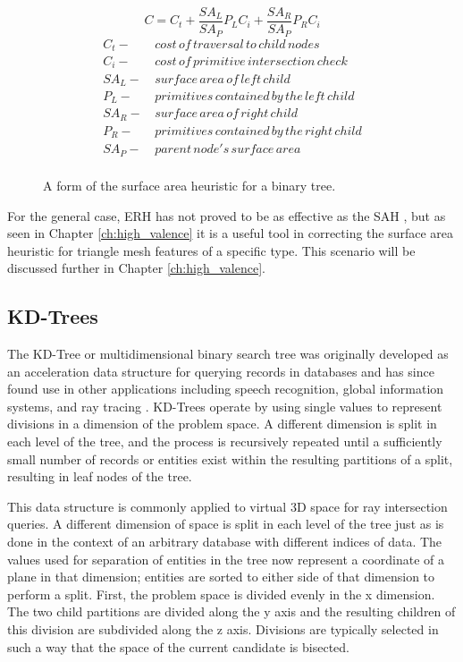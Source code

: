 \begin{figure}[H]
  \begin{equation}
    C =  C_{t} + \frac{SA_{L}}{SA_{P}}P_{L}C_{i} +  \frac{SA_{R}}{SA_{P}}P_{R}C_{i}
    \label{eq:SAH}
  \end{equation}
  \begin{align*}
    C_{t} - & \,cost\, of\, traversal\, to\, child\, nodes \\
    C_{i} - & \, cost\, of\, primitive\, intersection\, check\, \\
    SA_{L} - &  \,surface\, area\, of\, left\, child \\
    P_{L} - & \, primitives\, contained\, by\, the\, left\, child  \\
    SA_{R} - & \, surface\, area\, of\, right\, child \\
    P_{R} - & \, primitives\, contained\, by\, the\, right\, child \\
    SA_{P} - & \, parent\, node's \, surface \, area \\
  \end{align*}
  \caption[Formulation of the surface area heuristic.]{A form of the surface area heuristic for a binary tree.}
  \label{fig:SAH}
\end{figure}

For the general case, ERH has not proved to be as effective as the SAH \cite{Bittner_2013}, but as
seen in Chapter \ref{ch:high_valence} it is a useful tool in correcting the
surface area heuristic for triangle mesh features of a specific type. This
scenario will be discussed further in Chapter \ref{ch:high_valence}.

\subsection{KD-Trees}
\label{subsec:kd-trees}
The KD-Tree or multidimensional binary search tree was originally developed as
an acceleration data structure for querying records in databases and has since
found use in other applications including speech recognition, global information
systems, and ray tracing \cite{Bentley_1975}. KD-Trees operate by using single
values to represent divisions in a dimension of the problem space. A different
dimension is split in each level of the tree, and the process is recursively
repeated until a sufficiently small number of records or entities exist within
the resulting partitions of a split, resulting in leaf nodes of the tree.

This data structure is commonly applied to virtual 3D space for ray intersection
queries. A different dimension of space is split in each level of the tree just
as is done in the context of an arbitrary database with different indices of
data. The values used for separation of entities in the tree now represent a
coordinate of a plane in that dimension; entities are sorted to either side
of that dimension to perform a split. First, the problem space is divided evenly
in the x dimension. The two child partitions are divided along the y axis
and the resulting children of this division are subdivided along the z
axis. Divisions are typically selected in such a way that the space of the current
candidate is bisected.

